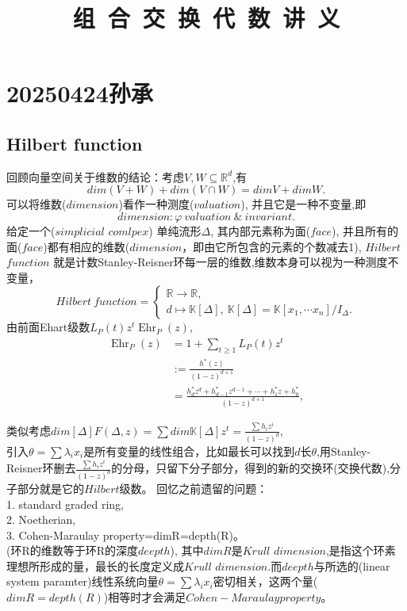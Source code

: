 \documentclass[12pt,a4paper]{ctexbook} %
\title{{\kaishu\fontsize{48}{60}\selectfont 组~合~交~换~代~数~讲~义}} %
\numberwithin{figure}{section}
\theoremstyle{problemstyle}
\numberwithin{equation}{section} %
\begin{document}
\section{20250424孙承}
\subsection{ Hilbert function}

回顾向量空间关于维数的结论：考虑$V ,W \subseteq  \mathbb{R}^d$,有 $$ dim(V+W)+dim(V\cap W)=dimV+dimW .$$
可以将维数($dimension$)看作一种测度($valuation$), 并且它是一种不变量,即
$$ dimension : \varphi \ valuation \ \& \ invariant. $$
给定一个($simplicial$ $comlpex$) 单纯流形$\Delta$, 其内部元素称为面($face$), 并且所有的面($face$)都有相应的维数($dimension$，即由它所包含的元素的个数减去1),
 $Hilbert$ $function$ 就是计数Stanley-Reisner环每一层的维数,维数本身可以视为一种测度不变量，
    $$ Hilbert \ function=
	\begin{cases}
		\mathbb{R}\rightarrow\mathbb{R}, \\ 
		d\mapsto\mathbb{K}[\Delta] ,\ \mathbb{K}[\Delta]=\mathbb{K}[x_{1}, \cdots x_{n}]/I_{\Delta}.
	\end{cases}$$
由前面Ehart级数$L_P(t) z^t$\rightarrow$\operatorname{Ehr}_P(z)$,
\begin{align*}
    \operatorname{Ehr}_P(z) 
    &= 1 + \sum_{t \geq 1} L_P(t) z^t \\
    &:= \frac{h^*(z)}{(1-z)^{d+1}} \\
    &=\frac{h_d^* z^d + h_{d-1}^* z^{d-1} + \cdots + h_1^* z + h_0^*}{(1 - z)^{d+1}},
\end{align*}

类似考虑$dim[\Delta]$\rightarrow$F(\Delta,z)=\sum dim\mathbb{K}[\Delta]z^{t}=\frac{\sum h_{i}z^{i}}{(1-z)^{d}}$,\\
引入$\theta =\sum \lambda_{i}x_{i}$是所有变量的线性组合，比如最长可以找到$d$长$\theta$,用Stanley-Reisner环删去$\frac{\sum h_{i}z^{i}}{(1-z)^{d}}$的分母，只留下分子部分，得到的新的交换环(交换代数),分子部分就是它的$Hilbert$级数。
回忆之前遗留的问题：\\
1. standard graded ring,\\
2.  Noetherian,\\
3. Cohen-Maraulay property=dimR=depth(R)。\\(环R的维数等于环R的深度$deepth$),
其中$dimR$是$Krull$ $dimension$,是指这个环素理想所形成的量，最长的长度定义成$Krull$ $dimension$.而$deepth$与所选的(linear system paramter)线性系统向量$\theta =\sum \lambda_{i}x_{i}$密切相关，这两个量($dimR=depth(R)$)相等时才会满足$Cohen-Maraulay property$。
\end{document}
